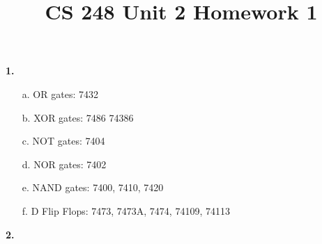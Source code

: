 \documentclass[12pt]{article}
\title{CS 248 Unit 2 Homework 1}
\begin{document}
    \bf{1.}
    \begin{itemize}
        \item[a.] OR gates: 7432
        \item[b.] XOR gates: 7486 74386
        \item[c.] NOT gates: 7404
        \item[d.] NOR gates: 7402
        \item[e.] NAND gates: 7400, 7410, 7420
        \item[f.] D Flip Flops: 7473, 7473A, 7474, 74109, 74113
    \end{itemize}

    \bf{2.}
\end{document}

